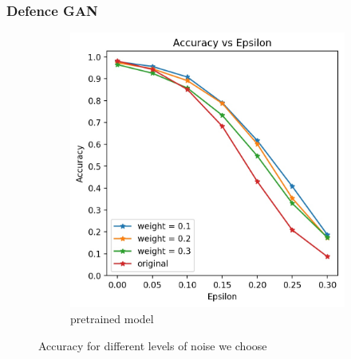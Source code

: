 \subsubsection{Defence GAN}
\begin{figure}[h!]
	\centering
	\begin{subfigure}{.4\textwidth}
		\includegraphics[width=\textwidth]{pretrained_Accuracy_vs_Epsilon_tv.jpg}
		\caption{pretrained model}
		\label{fig: tv pre}
	\end{subfigure}
	
	\caption{Accuracy for different levels of noise we choose}
\end{figure}
